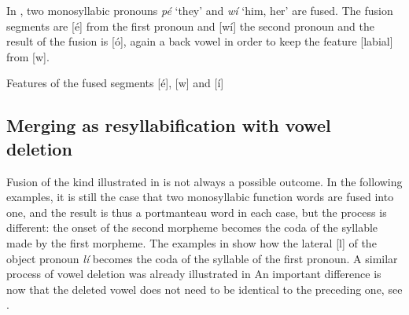 \documentclass[output=paper]{langscibook}
\begin{document}
In , two monosyllabic pronouns \textit{pé} ‘they’ and \textit{wí} ‘him, her’ are fused. The fusion segments are [é] from the first pronoun and [wí] the second pronoun and the result of the fusion is [ó], again a back vowel in order to keep the feature [labial] from [w].  

\begin{exe}
\ex Features of the fused segments [é], [w] and [í]\label{ex:traore:39}\\
\end{exe}
 

\subsection{Merging as resyllabification with vowel deletion}
\label{sec:traore:merging_as_resyll_with_vowel_deletion:4b}
Fusion of the kind illustrated in  is not always a possible outcome. In the following examples, it is still the case that two monosyllabic function words are fused into one, and the result is thus a portmanteau word in each case, but the process is different: the onset of the second morpheme becomes the coda of the syllable made by the first morpheme. The examples in  show how the lateral [l] of the object pronoun \textit{lí} becomes the coda of the syllable of the first pronoun. A similar process of vowel deletion was already illustrated in  An important difference is now that the deleted vowel does not need to be identical to the preceding one, see .
\end{document}
